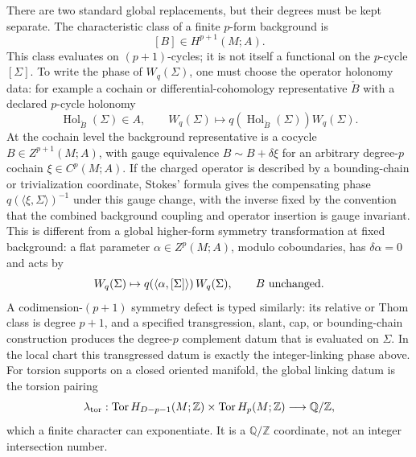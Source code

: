 There are two standard global replacements, but their degrees must be kept
separate.  The characteristic class of a finite \(p\)-form background is
\[
  [B]\in H^{p+1}(M;A).
\]
This class evaluates on \((p+1)\)-cycles; it is not itself a functional on the
\(p\)-cycle \([\Sigma]\).  To write the phase of \(W_q(\Sigma)\), one must
choose the operator holonomy data: for example a cochain or
differential-cohomology representative \(\check B\) with a declared
\(p\)-cycle holonomy
\[
  \operatorname{Hol}_{\check B}(\Sigma)\in A,
  \qquad
  W_q(\Sigma)\mapsto
  q\!\left(\operatorname{Hol}_{\check B}(\Sigma)\right)W_q(\Sigma).
\]
At the cochain level the background representative is a cocycle
\(B\in Z^{p+1}(M;A)\), with gauge equivalence
\(B\sim B+\delta\xi\) for an arbitrary degree-\(p\) cochain
\(\xi\in C^p(M;A)\).  If the charged operator is described by a bounding-chain
or trivialization coordinate, Stokes' formula gives the compensating phase
\(q(\langle\xi,\Sigma\rangle)^{-1}\) under this gauge change, with the inverse
fixed by the convention that the combined background coupling and operator
insertion is gauge invariant.  This is different from a global higher-form
symmetry transformation at fixed background: a flat parameter
\(\alpha\in Z^p(M;A)\), modulo coboundaries, has \(\delta\alpha=0\) and acts by
\[
  W_q(\Sigma)\mapsto
  q\!\left(\langle\alpha,[\Sigma]\rangle\right)W_q(\Sigma),
  \qquad B\ \hbox{unchanged}.
\]
A codimension-\((p+1)\) symmetry defect is typed similarly: its relative or
Thom class is degree \(p+1\), and a specified transgression, slant, cap, or
bounding-chain construction produces the degree-\(p\) complement datum that is
evaluated on \(\Sigma\).  In the local chart this transgressed datum is exactly
the integer-linking phase above.
For torsion supports on a closed oriented manifold, the global linking datum is
the torsion pairing
\[
  \lambda_{\rm tor}:
  \operatorname{Tor}H_{D-p-1}(M;\mathbb Z)
  \times
  \operatorname{Tor}H_p(M;\mathbb Z)
  \longrightarrow
  \mathbb Q/\mathbb Z ,
\]
which a finite character can exponentiate.  It is a \(\mathbb Q/\mathbb Z\)
coordinate, not an integer intersection number.

